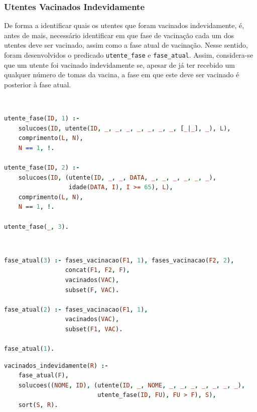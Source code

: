 \documentclass[a4paper, 11pt]{article}
\begin{document}
\subsubsection{Utentes Vacinados Indevidamente}

De forma a identificar quais os utentes que foram vacinados indevidamente, é, antes de mais, necessário identificar
em que fase de vacinação cada um dos utentes deve ser vacinado, assim como a fase atual de vacinação. Nesse sentido,
foram desenvolvidos o predicado \texttt{utente\_fase} e \texttt{fase\_atual}. Assim, considera-se que um utente foi
vacinado indevidamente se, apesar de já ter recebido um qualquer número de tomas da vacina, a fase em que este deve ser
vacinado é posterior à fase atual.

\

\begin{lstlisting}[language=Prolog, caption={Extensão do predicado \texttt{utente\_fase}}]
% Extensao do predicado utente_fase: ID, F -> {V, F}
utente_fase(ID, 1) :- 
    solucoes(ID, utente(ID, _, _, _, _, _, _, _, [_|_], _), L),
    comprimento(L, N),
    N == 1, !.

utente_fase(ID, 2) :-
    solucoes(ID, (utente(ID, _, _, DATA, _, _, _, _, _, _),
                  idade(DATA, I), I >= 65), L),
    comprimento(L, N),
    N == 1, !.

utente_fase(_, 3).
\end{lstlisting}

\

\begin{lstlisting}[language=Prolog, caption={Extensão do predicado \texttt{fase\_atual}}]
% Extensao do predicado fase_atual: F -> {V, F}
fase_atual(3) :- fases_vacinacao(F1, 1), fases_vacinacao(F2, 2),
                 concat(F1, F2, F),
                 vacinados(VAC),
                 subset(F, VAC).

fase_atual(2) :- fases_vacinacao(F1, 1),
                 vacinados(VAC),
                 subset(F1, VAC).

fase_atual(1).
\end{lstlisting}

\pagebreak

\begin{lstlisting}[language=Prolog, caption={Extensão do predicado \texttt{vacinados\_indevidamente}}]
% Extensao do predicado vacinados_indevidamente: R -> {V, F}
vacinados_indevidamente(R) :- 
    fase_atual(F),
    solucoes((NOME, ID), (utente(ID, _, NOME, _, _, _, _, _, _, _),
                          utente_fase(ID, FU), FU > F), S),
    sort(S, R).
\end{lstlisting}
\end{document}
